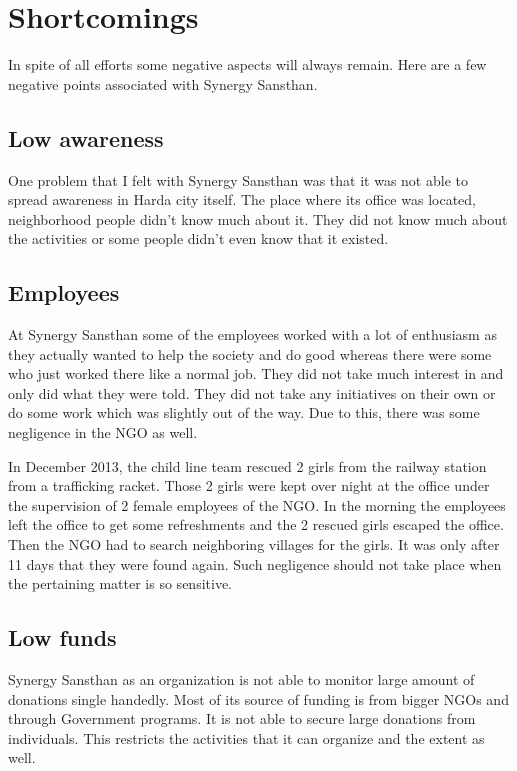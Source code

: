 \chapter{Shortcomings}
\ifpdf
    \graphicspath{{Chapter2/Chapter2Figs/PNG/}{Chapter2/Chapter2Figs/PDF/}{Chapter2/Chapter2Figs/}}
\else
    \graphicspath{{Chapter2/Chapter2Figs/EPS/}{Chapter2/Chapter2Figs/}}
\fi

In spite of all efforts some negative aspects will always remain. Here are a few negative points associated with Synergy Sansthan.

\section{Low awareness}
One problem that I felt with Synergy Sansthan was that it was not able to spread awareness in Harda city itself. The place where its office was located, neighborhood people didn't know much about it. They did not know much about the activities or some people didn't even know that it existed.

\section{Employees}
At Synergy Sansthan some of the employees worked with a lot of enthusiasm as they actually wanted to help the society and do good whereas there were some who just worked there like a normal job. They did not take much interest in and only did what they were told. They did not take any initiatives on their own or do some work which was slightly out of the way. Due to this, there was some negligence in the NGO as well. 

In December 2013, the child line team rescued 2 girls from the railway station from a trafficking racket. Those 2 girls were kept over night at the office under the supervision of 2 female employees of the NGO. In the morning the employees left the office to get some refreshments and the 2 rescued girls escaped the office. Then the NGO had to search neighboring villages for the girls. It was only after 11 days that they were found again. Such negligence should not take place when the pertaining matter is so sensitive. 

\section{Low funds}
Synergy Sansthan as an organization is not able to monitor large amount of donations single handedly. Most of its source of funding is from bigger NGOs and through Government programs. It is not able to secure large donations from individuals. This restricts the activities that it can organize and the extent as well.


